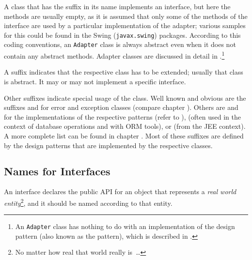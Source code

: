 A class that has the suffix  in its name implements an interface, but here the methods are usually empty, as it is assumed that only some of the methods of the interface are used by a particular implementation of the adapter; various samples for this could be found in the Swing (\lstinline|javax.swing|) \autocite{ORACLE_DOC_SWING_PACKAGE} packages. According to this coding conventions, an \lstinline|Adapter| class is always abstract even when it does not contain any abstract methods. Adapter classes are discussed in detail in .\footnote{An \lstinline|Adapter| class has nothing to do with an implementation of the  design pattern (also known as the  pattern), which is described in \autocite{Gamma:DesignPatterns}.}

A suffix  indicates that the respective class has to be extended; usually that class is abstract. It may or may not implement a specific interface.

Other suffixes indicate special usage of the class. Well known and obvious are the suffixes  and  for error and exception classes (compare chapter ). Others are  and  for the implementations of the respective patterns (refer to \autocite{Gamma:DesignPatterns}),  (often used in the context of database operations and with ORM tools), or  (from the JEE context). A more complete list can be found in chapter . Most of these suffixes are defined by the design patterns that are implemented by the respective classes.


\subsection{Names for Interfaces}\label{sec:NamesForInterfaces}
An interface declares the public API for an object that represents a \textit{real world entity}\footnote{No matter how real that world really is~…}, and it should be named according to that entity.

